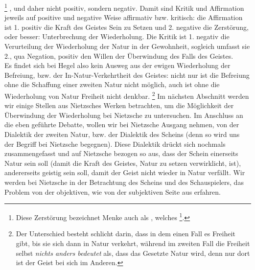 \documentclass[12pt, a4paper, openany]{report}
\begin{document}
\footnote{
    \cite[][S. 148. Hervorhebung von mir.]{menke_autonomie_2018}
    Diese Zerstörung bezeichnet Menke auch als , welches \footcite[][147]{menke_autonomie_2018}.
}%
, und daher nicht positiv, sondern negativ.
Damit sind Kritik und Affirmation jeweils auf positive und negative Weise affirmativ bzw. kritisch:
die Affirmation ist 1. positiv die Kraft des Geistes Sein zu Setzen und 2. negative die Zerstörung, oder besser: 
Unterbrechung der Wiederholung. 
Die Kritik ist 1. negativ die Verurteilung der Wiederholung der Natur in der Gewohnheit, sogleich umfasst sie 2., qua Negation, positiv den Willen der Überwindung des Falls des Geistes.\\

Es findet sich bei Hegel also kein Ausweg aus der ewigen Wiederholung der Befreiung, bzw. der In-Natur-Verkehrtheit des Geistes:
nicht nur ist die Befreiung ohne die Schaffung einer zweiten Natur nicht möglich, auch ist ohne die Wiederholung von Natur Freiheit nicht denkbar.%
\footnote{
    Der Unterschied besteht schlicht darin, dass in dem einen Fall es Freiheit  gibt, bis sie sich dann in Natur verkehrt, während im zweiten Fall die Freiheit selbst \emph{nichts anders bedeutet} als, dass das Gesetzte Natur wird, denn nur dort ist der Geist bei sich im Anderen.
}
Im nächsten Abschnitt werden wir einige Stellen aus Nietzsches Werken betrachten, um die Möglichkeit der Überwindung der Wiederholung bei Nietzsche zu untersuchen.
Im Anschluss an die eben geführte Debatte, wollen wir bei Nietzsche Ausgang nehmen, von der Dialektik der zweiten Natur, bzw. der Dialektik des Scheins (denn so wird uns der Begriff bei Nietzsche begegnen).
Diese Dialektik drückt sich nochmals zusammengefasst und auf Nietzsche bezogen so aus, dass der Schein einerseits Natur sein soll (damit die Kraft des Geistes, Natur zu setzen verwirklicht, ist), andererseits geistig sein soll, damit der Geist nicht wieder in Natur verfällt. 
Wir werden bei Nietzsche in der Betrachtung des Scheins und des Schauspielers, das Problem von der objektiven, wie von der subjektiven Seite aus erfahren. 
\end{document}

